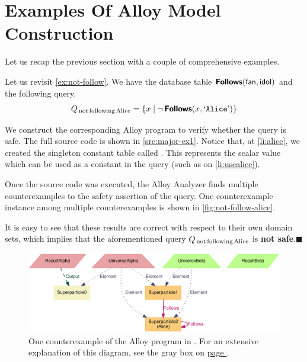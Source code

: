 \section{Examples Of Alloy Model Construction}

Let us recap the previous section with a couple of comprehensive examples.

\smallskip
\begin{example}
    \label{ex:major-ex1}
    Let us revisit \autoref{ex:not-follow}. We have the database table  $\rel{Follows}(\field{fan},\field{idol})$ and the following query.
    \[
        Q_\text{\,not\,following\,Alice} =
            \{ x \mid \neg\,\text{\textnormal{\textsf{\textbf{Follows}}}}(x, \text{\textnormal{`\ttfamily{Alice}}'}) \}
    \]

    We construct the corresponding Alloy program to verify whether the query is safe. The full source code is shown in \autoref{src:major-ex1}. Notice that, at \autoref{li:alice}, we created the singleton constant table called . This represents the scalar value which can be used as a constant in the query (such as on \autoref{li:usealice}).

    Once the source code was executed, the Alloy Analyzer finds multiple counterexamples to the safety assertion of the query. One counterexample instance among multiple counterexamples is shown in \autoref{fig:not-follow-alice}.

    It is easy to see that these results are correct with respect to their own domain sets, which implies that the aforementioned query $Q_\text{\,not\,following\,Alice}$ is \textbf{not safe}.\hfill$\blacksquare$
\end{example}

\begin{figure}[!h]
        \centering
        \includegraphics[width=0.99\linewidth]{figures/not-follow-alice.eps}
        \smallskip
        \caption[One counterexample of the Alloy program in .]{
            One counterexample of the Alloy program in . For an extensive explanation of this diagram, see the gray box on \hyperref[fig:not-follow-alice-exp]{page \pageref*{fig:not-follow-alice-exp}}.
        }
        \label{fig:not-follow-alice}
    \vspace*{-1pc}
\end{figure}

